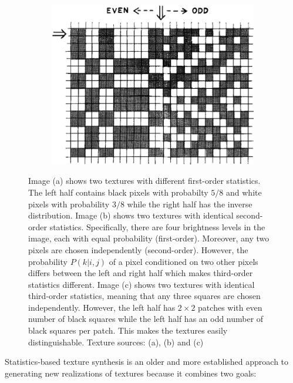 \begin{figure}[ht]
\begin{subfigure}[b]{0.29\textwidth}
        \caption{}
    \end{subfigure}
    \hfill
    \begin{subfigure}[b]{0.39\textwidth}
        \centering
        \includegraphics[width=\textwidth]{images/02-julesz-3rd_order.jpg}
        \caption{}
    \end{subfigure}
    \caption{Image (a) shows two textures with different first-order statistics. The left half contains black pixels with probabilty \(5/8\) and white pixels with probability \(3/8\) while the right half has the inverse distribution. Image (b) shows two textures with identical second-order statistics. Specifically, there are four brightness levels in the image, each with equal probability (first-order). Moreover, any two pixels are chosen independently (second-order). However, the probability \(P(k | i,j)\) of a pixel conditioned on two other pixels differs between the left and right half which makes third-order statistics different. Image (c) shows two textures with identical third-order statistics, meaning that any three squares are chosen independently. However, the left half has \(2 \times 2\) patches with even number of black squares while the left half has an odd number of black squares per patch. This makes the textures easily distinguishable. Texture sources: \citet{Julesz1962} (a), (b) and \citet{Julesz1973} (c)}
    \label{fig:background_julesz_textures}
\end{figure}

Statistics-based texture synthesis is an older and more established approach to generating new realizations of textures because it combines two goals:

